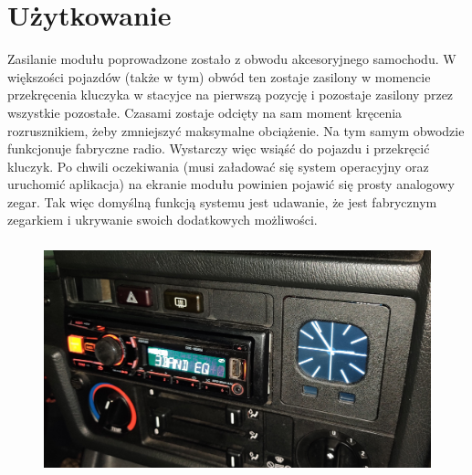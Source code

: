\documentclass[declaration,shortabstract, inz]{iithesis}
\begin{document}

\chapter{Użytkowanie}
Zasilanie modułu poprowadzone zostało z obwodu akcesoryjnego samochodu. W większości pojazdów (także w tym) obwód ten zostaje zasilony w momencie przekręcenia kluczyka w stacyjce na pierwszą pozycję i pozostaje zasilony przez wszystkie pozostałe. Czasami zostaje odcięty na sam moment kręcenia rozrusznikiem, żeby zmniejszyć maksymalne obciążenie. Na tym samym obwodzie funkcjonuje fabryczne radio. Wystarczy więc wsiąść do pojazdu i przekręcić kluczyk. Po chwili oczekiwania (musi załadować się system operacyjny oraz uruchomić aplikacja) na ekranie modułu powinien pojawić się prosty analogowy zegar. Tak więc domyślną funkcją systemu jest udawanie, że jest fabrycznym zegarkiem i ukrywanie swoich dodatkowych możliwości.

\begin{figure}[htp]
    \centering
    \includegraphics[width=12cm, height=6.75cm]{images/cocpit_clock.jpg}
    \label{fig:cocpit_clock}
\end{figure}
\end{document}
